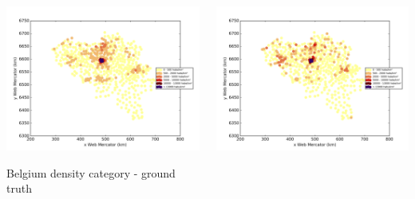 \documentclass[c]{beamer}
\begin{document}
\begin{frame}
\begin{columns}
 \begin{column}{0.5\textwidth}
  \begin{overlayarea}{\linewidth}{4cm}
    \centering\vfill
    \includegraphics[scale=0.50]{images/Belgium/density_ground_truth.png}
  \end{overlayarea}
  \begin{overlayarea}{\linewidth}{0.5cm}
    \centering
    \tiny Belgium density category - ground truth\par
  \end{overlayarea}
 \end{column}
 \begin{column}{0.5\textwidth}
  \begin{overlayarea}{\linewidth}{4cm}
    \centering\vfill
    \includegraphics[scale=0.50]{images/Belgium/nn/density_classification.png}

\end{overlayarea}
\end{column}
\end{columns}
\end{frame}
\end{document}
